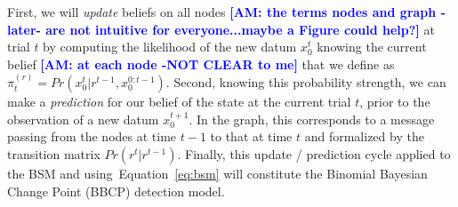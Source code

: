 \documentclass[12pt,english]{article}%
\newcommand{\seeEq}[1]{Equation~\ref{eq:#1}}
\newcommand{\AM}[1]{\textbf{\textcolor{blue}{[AM: #1]}}}
\begin{document}
First, we will \emph{update} beliefs on all nodes \AM{the terms nodes and graph -later- are not intuitive for everyone...maybe a Figure could help?} at trial $t$
by computing the likelihood of the new datum $x_0^t$ knowing the current belief \AM{at each node -NOT CLEAR to me} that we define as $\pi^{(r)}_t=Pr(x_0^t | r^{t-1}, x_0^{0:t-1})$. 
Second, knowing this probability strength, %
we can make a \emph{prediction} for our belief of the state at the current trial $t$,
prior to the observation of a new datum $x_0^{t+1}$.
In the graph, this corresponds to a message passing from the nodes at time $t-1$
to that at time $t$ and formalized by the transition matrix $Pr(r^t | r^{t-1})$.
Finally, this update / prediction cycle applied to the BSM and using~\seeEq{bsm}
will constitute the Binomial Bayesian Change Point (BBCP) detection model.
\end{document}
